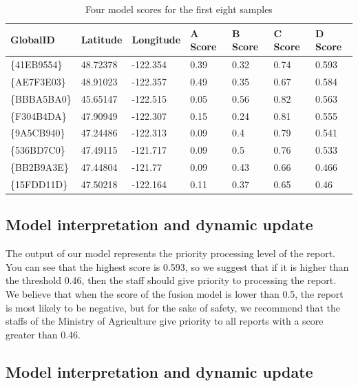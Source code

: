 \documentclass{mcmthesis}
\numberwithin{figure}{section}
\numberwithin{table}{section}
\begin{document}
\begin{table}[]
  \centering
  
  \begin{tabular}{lllllll}
  \hline
  GlobalID                                 & Latitude & Longitude & A Score & B Score & C Score & D Score \\ \hline
  \{41EB9554\} & 48.72378 & -122.354  & 0.39    & 0.32    & 0.74    & 0.593   \\
  \{AE7F3E03\} & 48.91023 & -122.357  & 0.49    & 0.35    & 0.67    & 0.584   \\
  \{BBBA5BA0\} & 45.65147 & -122.515  & 0.05    & 0.56    & 0.82    & 0.563   \\
  \{F304B4DA\} & 47.90949 & -122.307  & 0.15    & 0.24    & 0.81    & 0.555   \\
  \{9A5CB940\} & 47.24486 & -122.313  & 0.09    & 0.4     & 0.79    & 0.541   \\
  \{536BD7C0\} & 47.49115 & -121.717  & 0.09    & 0.5     & 0.76    & 0.533   \\
  \{BB2B9A3E\} & 47.44804 & -121.77   & 0.09    & 0.43    & 0.66    & 0.466   \\
  \{15FDD11D\} & 47.50218 & -122.164  & 0.11    & 0.37    & 0.65    & 0.46    \\ \hline
  \end{tabular}
  \caption{Four model scores for the first eight samples}
  \end{table}

\subsection{Model interpretation and dynamic update}

The output of our model represents the priority processing level of the report. You can see that the highest score is 0.593, so we suggest that if it is higher than the threshold 0.46, then the staff should give priority to processing the report. We believe that when the score of the fusion model is lower than 0.5, the report is most likely to be negative, but for the sake of safety, we recommend that the staffs of the Ministry of Agriculture give priority to all reports with a score greater than 0.46.


\subsection{Model interpretation and dynamic update}
\end{document}
